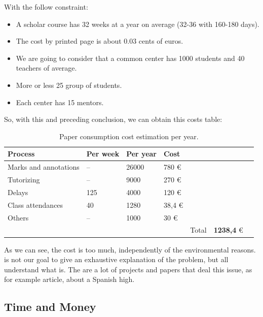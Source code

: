 With the follow constraint:

\begin{itemize}
  \setlength{\itemsep}{0pt}
\item A scholar course has 32 weeks at a year on average (32-36 with 160-180 days).
\item The cost by printed page is about 0.03 cents of euros.
\item We are going to consider that a common center has 1000 students and 40 teachers of average.
\item More or less 25 group of students.
\item Each center has 15 mentors.
\end{itemize}

So, with this and preceding conclusion, we can obtain this costs table:

\begin{table}[H]
\centering

\begin{tabular}{@{}lllllll@{}}

Process & Per week  & Per year  & Cost  \\
\midrule

Marks and annotations   &  --  &  26000  &   780      \euro  \\
Tutorizing              &  --  &  9000   &   270      \euro  \\
Delays                  &  125 &  4000   &   120      \euro  \\
Class attendances       &  40  &  1280   &   38,4     \euro  \\
Others                  &  --  &  1000   &   30       \euro  \\

\midrule
& & & & Total & \textbf{1238,4} \euro \\
\end{tabular}
\caption{Paper consumption cost estimation per year.}
\label{my-label}
\end{table}


\noindent As we can see, the cost is too much, independently of the environmental reasons.
is not our goal to give an exhaustive explanation of the problem, but all understand what is.
The are a lot of projects and papers that deal this issue, as for example \cite{paperconsumption}
article, about a Spanish high. \pagebreak

\subsection{Time and Money}

